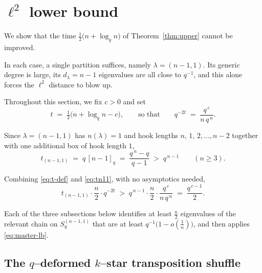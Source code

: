 \documentclass[11pt]{article}
\theoremstyle{plain}  %
\begin{document}



\section{\texorpdfstring{$\ell^{2}$}{l2} lower bound}\label{sec:l2lower}



We show that the time $\frac12\bigl(n+\log_q n\bigr)$ of
Theorem~\ref{thm:upper} cannot be improved.

In each case, a single partition suffices, namely $\lambda = (n-1,1)$. Its
generic degree is large, its $d_\lambda = n-1$ eigenvalues are all close to
$q^{-1}$, and this alone forces the $\ell^{2}$ distance to blow up.



Throughout this section, we fix $c>0$ and set
\begin{equation}\label{eq:t-def}
  t \;=\; \tfrac12\bigl(n + \log_q n - c\bigr),
  \qquad\text{so that}\qquad
  q^{-2t} \;=\; \frac{q^{\,c}}{n\,q^{\,n}} .
\end{equation}



Since $\lambda = (n-1,1)$ has $n(\lambda)=1$ and hook lengths
$n,\,1,\,2,\dots,n-2$ together with one additional box of hook length $1$,
\begin{equation}\label{eq:tn11}
  t_{(n-1,1)}
  \;=\; q\,[n-1]_q
  \;=\; \frac{q^{\,n}-q}{q-1}
  \;>\; q^{\,n-1}
  \qquad (n \ge 3).
\end{equation}



Combining \eqref{eq:t-def} and \eqref{eq:tn11}, with no asymptotics needed,
\begin{equation}\label{eq:master-lb}
  t_{(n-1,1)}\cdot \frac{n}{2}\cdot q^{-2t}
  \;>\; q^{\,n-1}\cdot\frac{n}{2}\cdot\frac{q^{\,c}}{n\,q^{\,n}}
  \;=\; \frac{q^{\,c-1}}{2} .
\end{equation}



Each of the three subsections below identifies at least $\frac n2$ eigenvalues
of the relevant chain on $S^{(n-1,1)}_q$ that are at least
$q^{-1}\bigl(1-o(\frac{1}{n})\bigr)$, and then applies \eqref{eq:master-lb}.

\bigskip

\subsection{The \texorpdfstring{$q$--deformed $k$--star}{q-deformed k-star} transposition shuffle}
\end{document}
